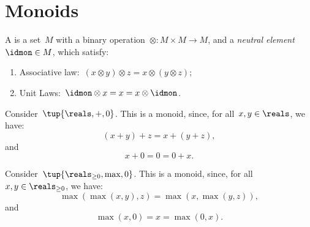 

\section{Monoids}\label{sec:parallelism-monoids}

\begin{definition}[Monoid]\label{def:monoid}
    A  is a set~$M$ with a binary operation~$\otimes \colon M\times M\to M$, and a \emph{neutral element}~$\idmon\in M$, which satisfy:
    \begin{enumerate}
        \item Associative law:~$(x\otimes y)\otimes z=x\otimes (y\otimes z)$;
        \item Unit Laws:~$\idmon\otimes x=x=x\otimes \idmon$.
    \end{enumerate}
\end{definition}
\begin{example}
    Consider~$\tup{\reals,+,0}$. This is a monoid, since, for all~$x,y\in \reals$, we have:
    \begin{equation*}
    (x+y)
        +z=x+(y+z),
    \end{equation*}
    and
    \begin{equation*}
        x+0=0=0+x.
    \end{equation*}
\end{example}

\begin{example}
    Consider~$\tup{\reals_{\geq0},\max,0}$. This is a monoid, since, for all~$x,y\in \reals_{\geq0}$, we have:
    \begin{equation*}
        \max(\max(x,y),z)=\max(x,\max(y,z)),
    \end{equation*}
    and
    \begin{equation*}
        \max(x,0)=x=\max(0,x).
    \end{equation*}
\end{example}

